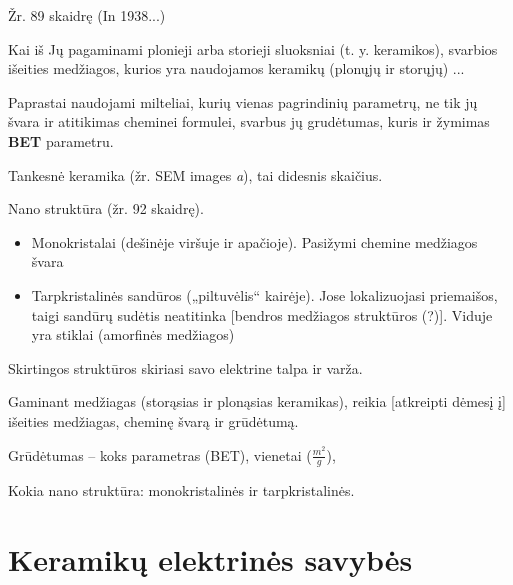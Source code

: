 Žr. 89 skaidrę (In 1938...)

Kai iš Jų pagaminami plonieji arba storieji sluoksniai (t. y. keramikos),
svarbios išeities medžiagos, kurios yra naudojamos keramikų (plonųjų ir
storųjų) ...

Paprastai naudojami milteliai, kurių vienas pagrindinių parametrų,
ne tik jų švara ir atitikimas cheminei formulei,
svarbus jų grudėtumas, kuris ir žymimas \textbf{BET} parametru.

Tankesnė keramika (žr. SEM images \textit{a}), tai didesnis skaičius.

Nano struktūra (žr. 92 skaidrę).
\begin{itemize}
  \item Monokristalai (dešinėje viršuje ir apačioje). Pasižymi chemine
    medžiagos švara
  \item Tarpkristalinės sandūros („piltuvėlis“ kairėje).
    Jose lokalizuojasi priemaišos, taigi sandūrų sudėtis neatitinka
    [bendros medžiagos struktūros (?)]. Viduje yra stiklai (amorfinės
    medžiagos)
\end{itemize}
Skirtingos struktūros skiriasi savo elektrine talpa ir varža.

\begin{remember}
  \item Gaminant medžiagas (storąsias ir plonąsias keramikas), reikia
    [atkreipti dėmesį į] išeities medžiagas, cheminę švarą ir grūdėtumą.
  \item Grūdėtumas – koks parametras (BET), vienetai ($\frac{m^2}{g}$),
  \item Kokia nano struktūra: monokristalinės ir tarpkristalinės.
\end{remember}

\section{Keramikų elektrinės savybės}


